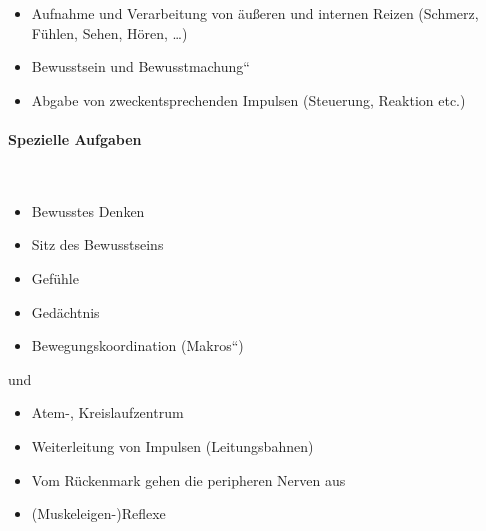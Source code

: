 \begin{itemize}
    \item Aufnahme  und Verarbeitung  von äußeren und internen  Reizen
    (Schmerz, Fühlen, Sehen, Hören, {\dots})
    \item Bewusstsein und {\quotedblbase}Bewusstmachung{\textquotedblleft}
    \item Abgabe  von zweckentsprechenden Impulsen (Steuerung, Reaktion
    etc.)
\end{itemize}



\paragraph{Spezielle Aufgaben}~



\begin{itemize}
    \item Bewusstes Denken
    \item Sitz des Bewusstseins
    \item Gefühle
    \item Gedächtnis
\end{itemize}



\begin{itemize}
    \item Bewegungskoordination ({\quotedblbase}Makros{\textquotedblleft})
\end{itemize}

 und 

\begin{itemize}
    \item Atem-, Kreislaufzentrum
\end{itemize}


\begin{itemize}
    \item Weiterleitung von Impulsen (Leitungsbahnen)
    \item Vom Rückenmark gehen die peripheren Nerven aus
    \item (Muskeleigen-)Reflexe
\end{itemize}


